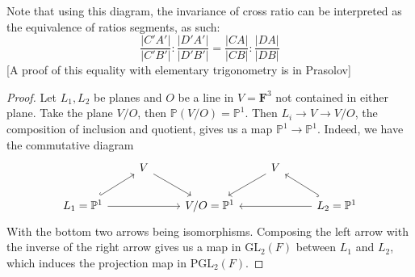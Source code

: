 \documentclass[12pt]{article}
\newcommand{\F}{\mathbf{F}}
\renewcommand{\P}{\mathbb{P}}
\newcommand{\GL}{\mathrm{GL}}
\newcommand{\PGL}{\mathrm{PGL}}
\begin{document}
    Note that using this diagram, the invariance of cross ratio can be interpreted as the equivalence of ratios segments, as such: 
    $$\frac{|C'A'|}{|C'B'|}: \frac{|D'A'|}{|D'B'|} = \frac{|CA|}{|CB|}: \frac{|DA|}{|DB|}$$
    [A proof of this equality with elementary trigonometry is in Prasolov]
    \begin{proof}
        Let $L_1, L_2$ be planes and $O$ be a line in $V = \F^3$ not contained in either plane. Take the plane $V/O$, then $\P(V/O) = \P^1$. Then $L_i \to V \to V/O$, the composition of inclusion and quotient, gives us a map $\P^1 \to \P^1$. Indeed, we have the commutative diagram
        \[\begin{tikzcd}
            & V && V \\
            {L_1=\mathbb{P}^1} && {V/O=\mathbb{P}^1} && {L_2 = \mathbb{P}^1}
            \arrow[hook, from=2-1, to=1-2]
            \arrow[hook, from=2-5, to=1-4]
            \arrow[from=1-2, to=2-3]
            \arrow[from=1-4, to=2-3]
            \arrow[from=2-1, to=2-3]
            \arrow[from=2-5, to=2-3]
        \end{tikzcd}\]
        With the bottom two arrows being isomorphisms. Composing the left arrow with the inverse of the right arrow gives us a map in $\GL_2(F)$ between $L_1$ and $L_2$, which induces the projection map in $\PGL_2(F)$.  
    \end{proof}
\end{document}
